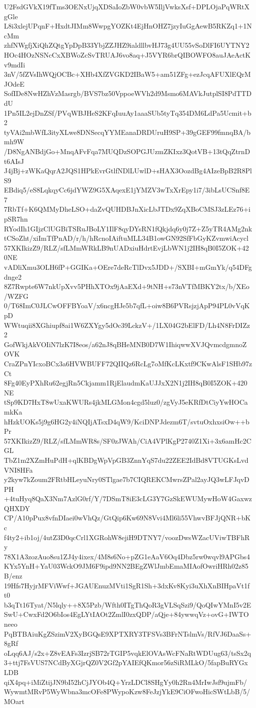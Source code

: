 U2FsdGVkX19fTms3OENxUjqXDSaIoZbW0vbW5IljVwksXsf+DPLOjaPqWRtXgGle
L8i3xlejUPqnF+HxdtJIMm8WwpgYOZKt4EjHnOHZ7jzyIuGgAewB5RKZq1+1NcMm
zhfNWgfjXiQhZQtgYpDpB33YbjZZJHZ9ialdllbvHJ73g4UU55vSoDlFI6UYTNY2
HOc4HOzNSNcCxXBWoZcSvTRUAJ6vo8aq+J5VYR6brQIBOWFO8auJAeActKv9mdIi
3nV/5fZVsIhWQjOCBc+XHb4XfZVGKD2IBaW5+am51ZFg+ezJcqAFUXlEQrMJOdeE
SofIDe8NwHZhVzMasrgb/BVS7bz50VppoeWVh2d9Msmo6MAVkJutplSI8PdTTDdU
1Pn5IL2ejDnZSf/PVqWBJHeS2KFqIuuAy1aaaSUb5tyTq354DM6LdPa5Ucmit+b2
tyVAi2mbWfL3ityXLwe8DNSecqYYMEanaDRDUruH9SP+39gGEF99fmnqBA/bmh9W
/D8NgANBdjGo+MnqAFvFqa7MUQDzSOPGJUzmZKIxz3QotVB+13tQqZtrnDt6AIsJ
J4jBj+zWKaQqrA2JQS1HPkEvrGtlfNDlLUwlD+sHAX3OozdBg4AIzeBpB2R8PlS9
EBdiq5/eS8LqkqyCc6jdYWZ9G5XAqexE1jYMZV3wTxXrEpy1i7/3ibLsUCSnf8E7
7RbTf+K6QMMyDheLSO+daZvQUHDBJnXicLbJTDx9ZqXBoCMSJ3zLEz76+ipSR7hn
RYodIh1GIjzClUGBiTSRuJBoLY1IlF8qyDYsRN1fQkjdq6y0j7Z+Z5yTR4AMg2nk
tCSoZht/xiImTfPnAD/r/h/hRcnoIAiftuMLL34B1owGN92SfFbGyKZvmwiAcycl
57XKIkizZ9/RLZ/sfLMmWRkLB9nUADxiuHdrtEvjLbWN1j2IH8qB0I5ZOK+420NE
vADliXmu3OLH6fP+GGIKa+OEre7deRcTlDvx5JDD+/SXBI+mGmYk/q54DFgdnge2
8Z7Rwpte6W7nkUpXvv5PHhXTOx9jAaEXd+9tNH+s73nVTfMBKY2tx/b/XEo/WZFG
0/T68ImC0JLCwOFFBYoaV/x6ncgHJe5b7qfL+oiw8B6PVRsjzjApP94PL0vVqKpD
WWtuqii8XGhiupf8ai1W6ZXYgy5dOc39LckzV+/1LX04G2bElFD/Lh4N8FrDIZz2
GofWkjAkVOIiN7lzK7I8eos/a62nJ8qBHeMNB0D7W1IhiqwwXVJQvmcdgmnoZOVK
CraZPnYIcxoBCx3a6HVWBUFF72QIIQz6RcLg7oMfKcLKxtf9CKwAlsF1SHb97zCt
8Fg40EyPXhRu62egjRn5Ckjamm1RjElaudmKaUJJxX2N1j2IH8qB0I5ZOK+420NE
tSp9KD7HxT8wUxaKWURs4jkMLGMon4cgd5luz0/zgVyJ5eKRfDtCiyYwHOCamkKa
hHzkUOKs5j9g6HG2y4iNQIjATsxD4qW9/KciDNPJdezm6T/svtuOxhxsiOw++bPr
57XKIkizZ9/RLZ/sfLMmWR8s/SF0zJWAh/CiA4VPlKgP2740Z1Xi+3x6amHc2CGL
TbZ1m2XZmHuPdH+qlKBDgWpVpGB3ZnnYqS7du22ZEE2IdBd8VTUGKsLvdVNI8HFa
y2kyw7kZoum2FRtbHLeyuNry0STlgae7b7CIQREKCMwrsZPal2ayJQ3wLFJqvDPH
+4tuHyq8QaX3Nm7AzlG0rf/Y/7DSmT8iE3cLG3Y7GzSkEWUMywHoW4GaxwzQHXDY
CP/A10pPux8vfnDIaei0wVhQz/GtQip6Kw69N8Vvi4Ml6li55VhwvBFJjQNR+bKc
f4ty2+ib1oj/4utZ3D0qcCrl1XGRohW8ejiH9DTNY7/voozDwsWZacUViwTBFhRy
78X1A3zozAuo8su1ZJ4y4ixex/4M8s6No+pZG1eAaV6Oq4Dbz5rw0wqvl9APGbs4
KYx5YnH+YaU03WckO9JM6F9ipd9NN2BEgZWlJmbEmaMIAofOwriHRh02z85B/enz
19Hfs7HyjrMFViWwf+JGAUEnuzMVti1SgR1Sh+3dxKv8Kyi3uXhXnBIHpaVt1ft0
b3qTt16Tyat/N5lqly++8X5Pzb/Wfth0ITgThQoR3gVLSqSzi9/QoQIwYMnI5v2E
SwU+CwxFd2O6bIos4EgLYtIAOt2ZmlI0zxQDP/aQje+84ywwqVz+ovG+IWTOneeo
PqBTBAiuKgZSzimV2XyBGQsE9XPTXRY3TFSVs3BFrNTslmVs/RfVJ6DaaSs+8gRf
oLqq6AJ/s2x+Z8vEAFs3IzrjSB72rTGIP5vqkElOVAsWcFNaRtWDUug63/tsSx2q
3+ttj7FsVUS7NCdByXGjrQZ0V2Gf2pYAIEfQKmor56zSiRMLkO/5fapBuRYGxLDB
qiX4pq+iMiZtijJN9bI52hCjJYOb4Q+YrzLDCl8SHgYy0h2Rn4MrIwJsf9ujmFb/
WywmtMRvP5WyWbna3mcOFe8PWypoKzw8FeJzjYkE9CiOFwoHicSWtLbB/5/MOart
